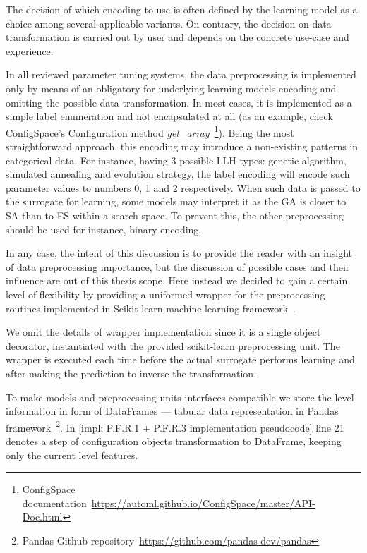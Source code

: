 The decision of which encoding to use is often defined by the learning model as a choice among several applicable variants. On contrary, the decision on data transformation is carried out by user and depends on the concrete use-case and experience.

In all reviewed parameter tuning systems, the data preprocessing is implemented only by means of an obligatory for underlying learning models encoding and omitting the possible data transformation. In most cases, it is implemented as a simple label enumeration and not encapsulated at all (as an example, check ConfigSpace's Configuration method \emph{get\_array}~\footnote{ConfigSpace documentation~\url{https://automl.github.io/ConfigSpace/master/API-Doc.html}}). Being the most straightforward approach, this encoding may introduce a non-existing patterns in categorical data. For instance, having 3 possible LLH types: genetic algorithm, simulated annealing and evolution strategy, the label encoding will encode such parameter values to numbers 0, 1 and 2 respectively. When such data is passed to the surrogate for learning, some models may interpret it as the GA is closer to SA than to ES within a search space. To prevent this, the other preprocessing should be used for instance, binary encoding.

In any case, the intent of this discussion is to provide the reader with an insight of data preprocessing importance, but the discussion of possible cases and their influence are out of this thesis scope. Here instead we decided to gain a certain level of flexibility by providing a uniformed wrapper for the preprocessing routines implemented in Scikit-learn machine learning framework~\cite{scikit-learn}.

We omit the details of wrapper implementation since it is a single object decorator, instantiated with the provided scikit-learn preprocessing unit. The wrapper is executed each time before the actual surrogate performs learning and after making the prediction to inverse the transformation.

To make models and preprocessing units interfaces compatible we store the level information in form of DataFrames — tabular data representation in Pandas framework~\footnote{Pandas Github repository~\url{https://github.com/pandas-dev/pandas}}. In \cref{impl: P.F.R.1 + P.F.R.3 implementation pseudocode} line 21 denotes a step of configuration objects transformation to DataFrame, keeping only the current level features.


